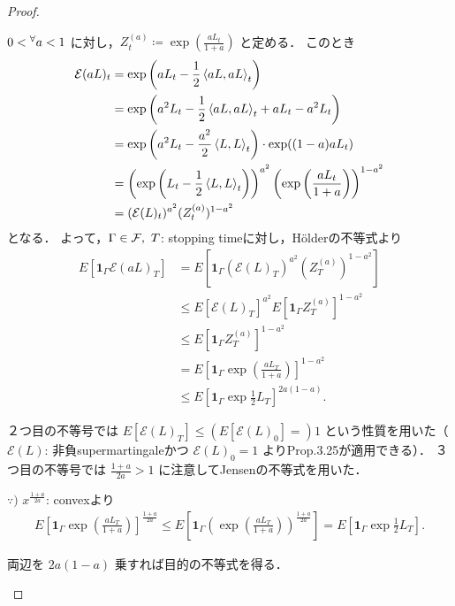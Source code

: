\documentclass{jsarticle}
\begin{document}
\begin{proof}
\begin{description}
        $0<{}^{\forall} a<1$ に対し，$Z_t^{(a)}\coloneqq\exp(\frac{aL_t}{1+a})$ と定める．
        このとき
        \begin{align}
            \mathcal{E}(aL)_t
            &= \exp\left(aL_t-\frac{1}{2}\left\langle aL,aL\right\rangle_t\right) \\
            &= \exp\left(a^2 L_t-\frac{1}{2}\left\langle aL,aL\right\rangle_t+aL_t-a^2 L_t\right) \\
            &= \exp\left(a^2 L_t-\frac{a^2}{2}\left\langle L,L\right\rangle_t\right)\cdot\exp((1-a)aL_t) \\
            &= \left(\exp\left(L_t-\frac{1}{2}\left\langle L,L\right\rangle_t\right)\right)^{a^2}\left(\exp\left(\frac{aL_t}{1+a}\right)\right)^{1-a^2} \\
            &= (\mathcal{E}(L)_t)^{a^2}(Z_t^{(a)})^{1-a^2}
        \end{align}
        となる．
        よって，$\Gamma\in\mathcal{F},\ T$: stopping timeに対し，H\"{o}lderの不等式より
        \begin{align}
            E[\bm{1}_\Gamma\mathcal{E}(aL)_T]
            &= E[\bm{1}_\Gamma(\mathcal{E}(L)_T)^{a^2}(Z_T^{(a)})^{1-a^2}] \\
            &\le E[\mathcal{E}(L)_T]^{a^2}
            E[\bm{1}_\Gamma Z_T^{(a)}]^{1-a^2} \\
            &\le E[\bm{1}_\Gamma Z_T^{(a)}]^{1-a^2} \\
            &= E\left[\bm{1}_\Gamma\exp\left(\frac{aL_T}{1+a}\right)\right]^{1-a^2} \\
            &\le E\left[\bm{1}_\Gamma\exp\frac{1}{2}L_T\right]^{2a(1-a)}.
        \end{align}

        ２つ目の不等号では $E[\mathcal{E}(L)_T]\le(E[\mathcal{E}(L)_0]=)1$ という性質を用いた（$\mathcal{E}(L)$: 非負supermartingaleかつ $\mathcal{E}(L)_0=1$ よりProp.3.25が適用できる）．
        ３つ目の不等号では $\frac{1+a}{2a}>1$ に注意してJensenの不等式を用いた．
        \begin{screen}
        $\because)$ $x^{\frac{1+a}{2a}}$: convexより
        \begin{align}
            E\left[\bm{1}_\Gamma\exp\left(\frac{aL_T}{1+a}\right)\right]^{\frac{1+a}{2a}}
            \le E\left[\bm{1}_\Gamma\left(\exp\left(\frac{aL_T}{1+a}\right)\right)^{\frac{1+a}{2a}}\right]
            = E\left[\bm{1}_\Gamma\exp\frac{1}{2}L_T\right].
        \end{align}

        両辺を $2a(1-a)$ 乗すれば目的の不等式を得る．
        \end{screen}
        

\end{description}
\end{proof}
\end{document}
